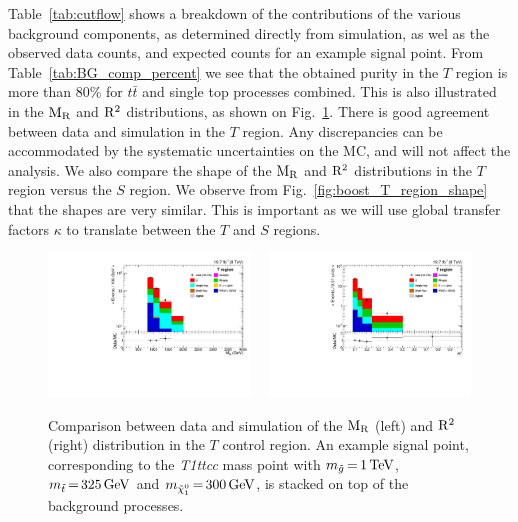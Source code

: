 Table~\ref{tab:cutflow} shows a breakdown of the contributions of the various background components,
as determined directly from simulation, as wel as the observed data counts, and expected counts for
an example signal point. From Table~\ref{tab:BG_comp_percent} we see that the obtained purity in the
$T$ region is more than 80\% for $t\bar{t}$ and single top processes combined. This is also
illustrated in the $\mathrm{M_R}$ and $\mathrm{R^2}$ distributions, as shown on Fig.~\ref{fig:boost_T_region_MR_Rsq}.
There is good agreement between data and simulation in the $T$ region. Any discrepancies can
be accommodated by the systematic uncertainties on the MC, and will not affect the analysis.
We also compare the shape of the $\mathrm{M_R}$ and $\mathrm{R^2}$ distributions in the $T$ region versus the $S$
region. We observe from Fig.~\ref{fig:boost_T_region_shape} that the shapes are very similar. This
is important as we will use global transfer factors $\kappa$ to translate between the $T$ and $S$
regions. 


\begin{figure}[htbp]
\centering
\includegraphics[width=0.48\textwidth]
{figures/razor_selection/plots/DataMC_MR_g1Mbg1W1LlmT100_mdPhig0p5_width}
~
\includegraphics[width=0.48\textwidth]
{figures/razor_selection/plots/DataMC_R2_g1Mbg1W1LlmT100_mdPhig0p5_width}
\caption{Comparison between data and simulation of the $\mathrm{M_R}$ (left) and $\mathrm{R^2}$ (right)
distribution in the $T$ control region. An example signal
point, corresponding to the {\it T1ttcc} mass point with $m_{\tilde{g}} \,{=}\, 1\,\text{Te\hspace{-.08em}V}$,
$m_{\tilde{t}} \,{=}\, 325\,\text{Ge\hspace{-.08em}V}$ and $m_{\tilde{\chi}_1^0} \,{=}\, 300\,\text{Ge\hspace{-.08em}V}$, is stacked on top of
the
background processes.
\label{fig:boost_T_region_MR_Rsq}}
\end{figure}

